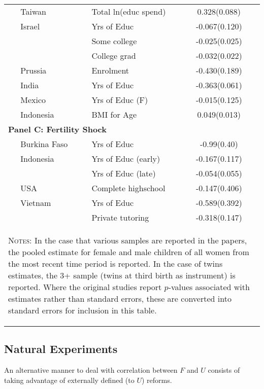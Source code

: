 \begin{table}
\begin{tabular}{lllc}
\citet{Lee2008}                  &Taiwan   &Total ln(educ spend) &0.328(0.088)  \\
\citet{Angristetal2010}          &Israel   &Yrs of Educ          & -0.067(0.120)\\
                                 &         &Some college         & -0.025(0.025)\\
                                 &         &College grad         & -0.032(0.022)\\
\citet{Beckeretal2010}           &Prussia  &Enrolment            & -0.430(0.189)\\
\citet{KumarKugler2011}          &India    &Yrs of Educ          & -0.363(0.061)\\
\citet{FitzsimonsMalde2014}      &Mexico   &Yrs of Educ (F)      & -0.015(0.125)\\ 
\citet{MillimetWang2011}         &Indonesia&BMI for Age          &  0.049(0.013)\\
\midrule
\multicolumn{4}{l}{\textbf{Panel C: Fertility Shock}} \\
\citet{Bougmaetal2015}           &Burkina Faso&Yrs of Educ        &-0.99(0.40)\\ 
\citet{Marlani2008}              &Indonesia   &Yrs of Educ (early)&-0.167(0.117)\\ 
                                 &            &Yrs of Educ (late) &-0.054(0.055)\\
\citet{Hotzetal1997}             &USA         &Complete highschool&-0.147(0.406)\\
\citet{DangRogers2013}           &Vietnam     &Yrs of Educ        &-0.589(0.392)\\
                                 &            &Private tutoring   &-0.318(0.147)\\
\bottomrule
\multicolumn{4}{p{12.9cm}}{\begin{footnotesize}\textsc{Notes:} In the case that 
various samples are reported in the papers, the pooled estimate for female and
male children of all women from the most recent time period is reported. In the 
case of twins estimates, the 3+ sample (twins at third birth as instrument) is
reported.  Where the original studies report $p$-values associated with estimates 
rather than standard errors, these are converted into standard errors for 
inclusion in this table.
\end{footnotesize}}
\end{tabular}     
\end{table}


\subsection{Natural Experiments}
An alternative manner to deal with correlation between $F$ and $U$ consists of
taking advantage of externally defined (to $U$) reforms.

